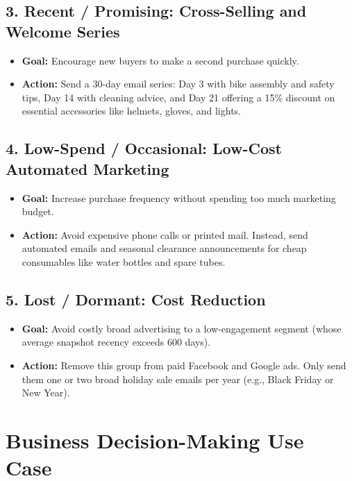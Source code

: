 \subsection{3. Recent / Promising: Cross-Selling and Welcome Series}
\label{subsec:rec_recent}
\begin{itemize}
    \item \textbf{Goal:} Encourage new buyers to make a second purchase quickly.
    \item \textbf{Action:} Send a 30-day email series: Day 3 with bike assembly and safety tips, Day 14 with cleaning advice, and Day 21 offering a 15\% discount on essential accessories like helmets, gloves, and lights.
\end{itemize}

\subsection{4. Low-Spend / Occasional: Low-Cost Automated Marketing}
\label{subsec:rec_low_spend}
\begin{itemize}
    \item \textbf{Goal:} Increase purchase frequency without spending too much marketing budget.
    \item \textbf{Action:} Avoid expensive phone calls or printed mail. Instead, send automated emails and seasonal clearance announcements for cheap consumables like water bottles and spare tubes.
\end{itemize}

\subsection{5. Lost / Dormant: Cost Reduction}
\label{subsec:rec_lost}
\begin{itemize}
    \item \textbf{Goal:} Avoid costly broad advertising to a low-engagement segment (whose average snapshot recency exceeds 600 days).
    \item \textbf{Action:} Remove this group from paid Facebook and Google ads. Only send them one or two broad holiday sale emails per year (e.g., Black Friday or New Year).
\end{itemize}


\section{Business Decision-Making Use Case}
\label{sec:bi_usecase}

